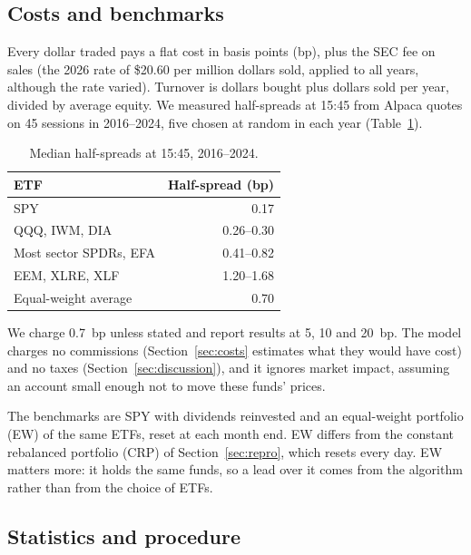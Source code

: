 \documentclass[11pt]{article}
\begin{document}
\subsection{Costs and benchmarks}

Every dollar traded pays a flat cost in basis points (bp), plus the SEC fee on sales (the 2026
rate of \$20.60 per million dollars sold, applied to all years, although the rate varied). Turnover is dollars bought plus dollars sold per year,
divided by average equity. We
measured half-spreads at 15:45 from Alpaca quotes on 45 sessions in 2016--2024, five chosen at
random in each year (Table~\ref{tab:spreads}).

\begin{table}[ht]
\centering
\caption{Median half-spreads at 15:45, 2016--2024.}\label{tab:spreads}
\begin{tabular}{lr}
\toprule
ETF & Half-spread (bp) \\
\midrule
SPY & 0.17 \\
QQQ, IWM, DIA & 0.26--0.30 \\
Most sector SPDRs, EFA & 0.41--0.82 \\
EEM, XLRE, XLF & 1.20--1.68 \\
Equal-weight average & 0.70 \\
\bottomrule
\end{tabular}
\end{table}

We charge 0.7~bp unless stated and report results at 5, 10 and 20~bp. The model charges no
commissions (Section~\ref{sec:costs} estimates what they would have cost) and no taxes
(Section~\ref{sec:discussion}), and it ignores market impact, assuming an account small enough
not to move these funds' prices.

The benchmarks are SPY with dividends reinvested and an equal-weight portfolio (EW) of the same
ETFs, reset at each month end. EW differs from the constant rebalanced portfolio (CRP) of
Section~\ref{sec:repro}, which resets every day. EW matters more: it holds the same funds, so a lead over it
comes from the algorithm rather than from the choice of ETFs.

\subsection{Statistics and procedure}
\end{document}
